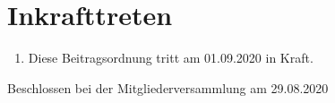 \documentclass[a4paper, 12pt]{scrartcl}
\begin{document}
\section{Inkrafttreten}
\begin{enumerate}
	\item Diese Beitragsordnung tritt am 01.09.2020 in Kraft.
\end{enumerate}


\vspace{2.5cm}

\noindent Beschlossen bei der Mitgliederversammlung am 29.08.2020

\end{document}

